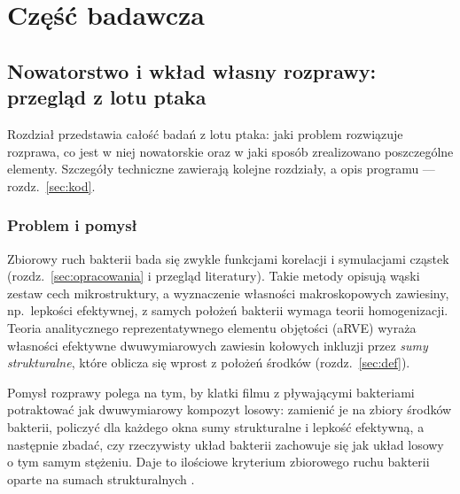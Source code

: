 \documentclass[12pt,a4paper,twoside,openright]{report}
\theoremstyle{definition}
\theoremstyle{remark}
\begin{document}
\part{Część badawcza}


{
\chapter{Nowatorstwo i wkład własny rozprawy: przegląd z lotu ptaka}\label{sec:nowosc}

Rozdział przedstawia całość badań z lotu ptaka: jaki problem rozwiązuje rozprawa, co jest w niej nowatorskie oraz w jaki sposób zrealizowano poszczególne elementy. Szczegóły techniczne zawierają kolejne rozdziały, a opis programu --- rozdz.~\ref{sec:kod}.

\section{Problem i pomysł}
Zbiorowy ruch bakterii bada się zwykle funkcjami korelacji i symulacjami cząstek (rozdz.~\ref{sec:opracowania} i przegląd literatury). Takie metody opisują wąski zestaw cech mikrostruktury, a wyznaczenie własności makroskopowych zawiesiny, np.\ lepkości efektywnej, z samych położeń bakterii wymaga teorii homogenizacji. Teoria analitycznego reprezentatywnego elementu objętości (aRVE) \cite{mityushev2006representative,drygas2019applied} wyraża własności efektywne dwuwymiarowych zawiesin kołowych inkluzji przez \emph{sumy strukturalne}, które oblicza się wprost z położeń środków (rozdz.~\ref{sec:def}).

Pomysł rozprawy polega na tym, by klatki filmu z pływającymi bakteriami potraktować jak dwuwymiarowy kompozyt losowy: zamienić je na zbiory środków bakterii, policzyć dla każdego okna sumy strukturalne i lepkość efektywną, a następnie zbadać, czy rzeczywisty układ bakterii zachowuje się jak układ losowy o tym samym stężeniu. Daje to ilościowe kryterium zbiorowego ruchu bakterii oparte na sumach strukturalnych \cite{ligocki2025study}.

}
\end{document}
